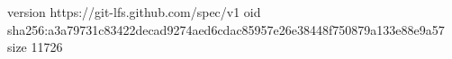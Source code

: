 version https://git-lfs.github.com/spec/v1
oid sha256:a3a79731c83422decad9274aed6cdac85957e26e38448f750879a133e88e9a57
size 11726
